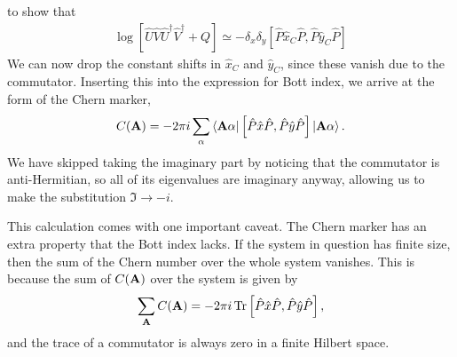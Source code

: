to show that
\begin{align}
	\log \left [ \hat U\hat V\hat U^\dag \hat V^\dag  + Q  \right ] \simeq - \delta_x \delta_y \left [  \hat P \hat x_C \hat P, \hat P \hat y_C \hat P  \right ]
\end{align}
We can now drop the constant shifts in $\hat x_C$ and $\hat y_C$, since these vanish due to the commutator. Inserting this into the expression for Bott index, we arrive at the form of the Chern marker,
\begin{align}
 	C(\bf A)  = -2\pi i \sum_\alpha \bra{\bf A \alpha} \left [  \hat P \hat x \hat P, \hat P \hat y \hat P  \right ]  \ket{\bf A \alpha} .
\end{align}
We have skipped taking the imaginary part by noticing that the commutator is anti-Hermitian, so all of its eigenvalues are imaginary anyway, allowing us to make the substitution $\Im \rightarrow -i $.\par
This calculation comes with one important caveat. The Chern marker has an extra property that the Bott index lacks. If the system in question has finite size, then the sum of the Chern number over the whole system vanishes. This is because the sum of $C(\bf A)$ over the system is given by
\begin{align}\label{eqn:chern_sum}
	\sum_{\bf A} C(\bf A) = - 2\pi i \, \tr  \left [  \hat P \hat x \hat P, \hat P \hat y \hat P  \right ] ,
\end{align}
and the trace of a commutator is always zero in a finite Hilbert space. 


